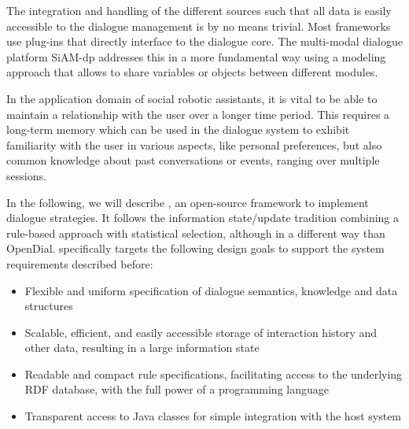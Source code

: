 The integration and handling of the different sources such that all data is
easily accessible to the dialogue management is by no means trivial. Most
frameworks use plug-ins that directly interface to the dialogue core. The
multi-modal dialogue platform SiAM-dp \citep{nesselrath2014siam}
addresses this in a more fundamental way using a modeling approach that allows
to share variables or objects between different modules.

In the application domain of social robotic assistants, it is vital to be able
to maintain a relationship with the user over a longer time period. This requires a long-term
memory which can be used in the dialogue system to exhibit familiarity with the
user in various aspects, like personal preferences, but also common knowledge
about past conversations or events, ranging over multiple sessions.

In the following, we will describe \vonda, an open-source framework to
implement dialogue strategies. It follows the information state/update
tradition \citep{traum2003information}
combining a rule-based approach with statistical selection, although in a
different way than OpenDial. \vonda specifically targets the following design
goals to support the system requirements described before:

\begin{itemize}
  \addtolength{\itemsep}{-.6\itemsep}
\item Flexible and uniform specification of dialogue semantics, knowledge and
  data structures
\item Scalable, efficient, and easily accessible storage of interaction history
  and other data, resulting in a large information state
\item Readable and compact rule specifications, facilitating access to the
  underlying RDF database, with the full power of a programming language
\item Transparent access to Java classes for simple integration with the host
  system
\end{itemize}
\fi

